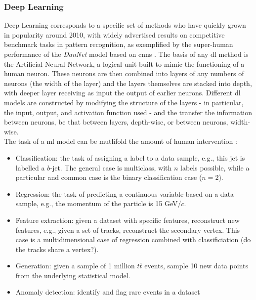 \subsubsection{Deep Learning} 
Deep Learning corresponds to a specific set of methods who have quickly grown in popularity around 2010, with widely advertised results on competitive benchmark tasks in pattern recognition, as exemplified by the super-human performance of the \textit{DanNet} \cite{DanNet} model based on \gls{cnn}s \cite{NIPS198953c3bce6}. The basis of any \gls{dl} method is the Artificial Neural Network, a logical unit built to mimic the functioning of a human neuron. These neurons are then combined into layers of any numbers of neurons (the width of the layer) and the layers themselves are stacked into depth, with deeper layer receiving as input the output of earlier neurons. Different \gls{dl} models are constructed by modifying the structure of the layers - in particular, the input, output, and activation function used - and the transfer the information between neurons, be that between layers, depth-wise, or  between neurons, width-wise.\\
The task of a \gls{ml} model can be mutlifold the amount of human intervention \cite{MurphyML}: 
\begin{itemize}
    \item Classification: the task of assigning a label to a data sample, e.g., this jet is labelled a $b$-jet. The general case is multiclass, with $n$ labels possible, while a particular and common case is the binary classification case ($n = 2$).
    \item Regression: the task of predicting a continuous variable based on a data sample, e.g., the momentum of the particle is 15 GeV/$c$. 
    \item Feature extraction: given a dataset with specific features, reconstruct new features, e.g., given a set of tracks, reconstruct the secondary vertex. This case is a multidimensional case of regression combined with classificiation (do the tracks share a vertex?).
    \item Generation: given a sample of 1 million $t\bar{t}$ events, sample 10 new data points from the underlying statistical model. 
    \item Anomaly detection: identify and flag rare events in a dataset
\end{itemize}

